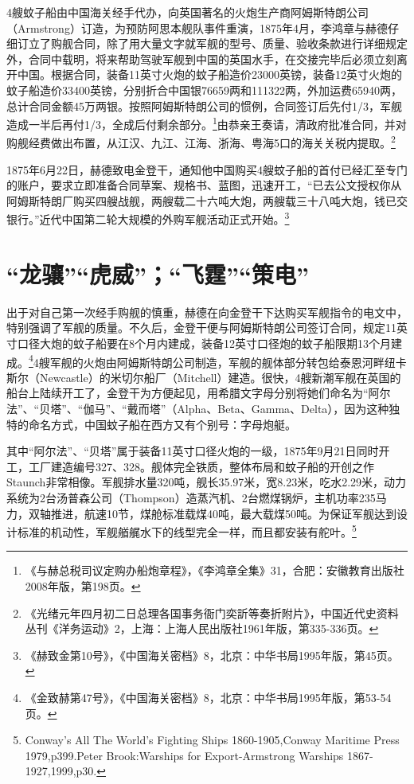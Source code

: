 \documentclass[12pt,UTF8]{ctexbook}
\begin{document}
4艘蚊子船由中国海关经手代办，向英国著名的火炮生产商阿姆斯特朗公司（Armstrong）订造，为预防阿思本舰队事件重演，1875年4月，李鸿章与赫德仔细订立了购舰合同，除了用大量文字就军舰的型号、质量、验收条款进行详细规定外，合同中载明，将来帮助驾驶军舰到中国的英国水手，在交接完毕后必须立刻离开中国。根据合同，装备11英寸火炮的蚊子船造价23000英镑，装备12英寸火炮的蚊子船造价33400英镑，分别折合中国银76659两和111322两，外加运费65940两，总计合同金额45万两银。按照阿姆斯特朗公司的惯例，合同签订后先付1/3，军舰造成一半后再付1/3，全成后付剩余部分。\footnote{《与赫总税司议定购办船炮章程》，《李鸿章全集》31，合肥：安徽教育出版社2008年版，第198页。}由恭亲王奏请，清政府批准合同，并对购舰经费做出布置，从江汉、九江、江海、浙海、粤海5口的海关关税内提取。\footnote{《光绪元年四月初二日总理各国事务衙门奕訢等奏折附片》，中国近代史资料丛刊《洋务运动》2，上海：上海人民出版社1961年版，第335-336页。}

1875年6月22日，赫德致电金登干，通知他中国购买4艘蚊子船的首付已经汇至专门的账户，要求立即准备合同草案、规格书、蓝图，迅速开工，“已去公文授权你从阿姆斯特朗厂购买四艘战舰，两艘载二十六吨大炮，两艘载三十八吨大炮，钱已交银行。”近代中国第二轮大规模的外购军舰活动正式开始。\footnote{《赫致金第10号》，《中国海关密档》8，北京：中华书局1995年版，第45页。}

\section{“龙骧”“虎威”；“飞霆”“策电”}

出于对自己第一次经手购舰的慎重，赫德在向金登干下达购买军舰指令的电文中，特别强调了军舰的质量。不久后，金登干便与阿姆斯特朗公司签订合同，规定11英寸口径大炮的蚊子船要在8个月内建成，装备12英寸口径炮的蚊子船限期13个月建成。\footnote{《金致赫第47号》，《中国海关密档》8，北京：中华书局1995年版，第53-54页。}4艘军舰的火炮由阿姆斯特朗公司制造，军舰的舰体部分转包给泰恩河畔纽卡斯尔（Newcastle）的米切尔船厂（Mitchell）建造。很快，4艘新潮军舰在英国的船台上陆续开工了，金登干为方便起见，用希腊文字母分别将她们命名为“阿尔法”、“贝塔”、“伽马”、“戴而塔”（Alpha、Beta、Gamma、Delta），因为这种独特的命名方式，中国蚊子船在西方又有个别号：字母炮艇。

其中“阿尔法”、“贝塔”属于装备11英寸口径火炮的一级，1875年9月21日同时开工，工厂建造编号327、328。舰体完全铁质，整体布局和蚊子船的开创之作Staunch非常相像。军舰排水量320吨，舰长35.97米，宽8.23米，吃水2.29米，动力系统为2台汤普森公司（Thompson）造蒸汽机、2台燃煤锅炉，主机功率235马力，双轴推进，航速10节，煤舱标准载煤40吨，最大载煤50吨。为保证军舰达到设计标准的机动性，军舰艏艉水下的线型完全一样，而且都安装有舵叶。\footnote{Conway's All The World's Fighting Ships 1860-1905,Conway Maritime Press 1979,p399.Peter Brook:Warships for Export-Armstrong Warships 1867-1927,1999,p30.}
\end{document}

